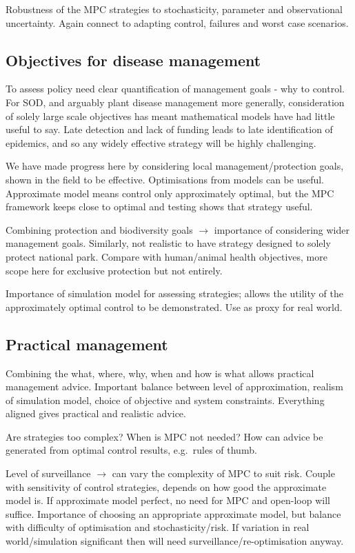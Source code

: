 Robustness of the MPC strategies to stochasticity, parameter and observational uncertainty. Again connect to adapting control, failures and worst case scenarios.

\subsection{Objectives for disease management}

To assess policy need clear quantification of management goals - why to control. For SOD, and arguably plant disease management more generally, consideration of solely large scale objectives has meant mathematical models have had little useful to say. Late detection and lack of funding leads to late identification of epidemics, and so any widely effective strategy will be highly challenging.

We have made progress here by considering local management/protection goals, shown in the field to be effective. Optimisations from models can be useful. Approximate model means control only approximately optimal, but the MPC framework keeps close to optimal and testing shows that strategy useful.

Combining protection and biodiversity goals $\rightarrow$ importance of considering wider management goals. Similarly, not realistic to have strategy designed to solely protect national park. Compare with human/animal health objectives, more scope here for exclusive protection but not entirely.

Importance of simulation model for assessing strategies; allows the utility of the approximately optimal control to be demonstrated. Use as proxy for real world.

\subsection{Practical management}

Combining the what, where, why, when and how is what allows practical management advice. Important balance between level of approximation, realism of simulation model, choice of objective and system constraints. Everything aligned gives practical and realistic advice.

Are strategies too complex? When is MPC not needed? How can advice be generated from optimal control results, e.g.\ rules of thumb.

Level of surveillance $\rightarrow$ can vary the complexity of MPC to suit risk. Couple with sensitivity of control strategies, depends on how good the approximate model is. If approximate model perfect, no need for MPC and open-loop will suffice. Importance of choosing an appropriate approximate model, but balance with difficulty of optimisation and stochasticity/risk. If variation in real world/simulation significant then will need surveillance/re-optimisation anyway.

